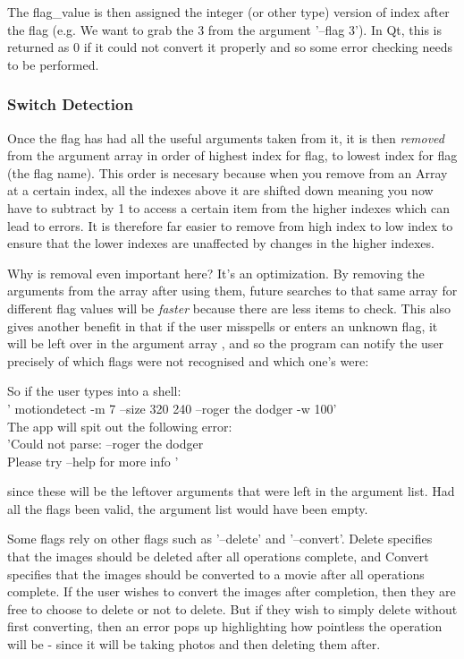 \documentclass[11pt]{article} %
\begin{document}
The flag\_value is then assigned the integer (or other type) version of index after the flag (e.g. We want to grab the 3 from the argument '--flag 3'). In Qt, this is returned as 0 if it could not convert it properly and so some error checking needs to be performed.

\subsubsection{Switch Detection}
Once the flag has had all the useful arguments taken from it, it is then {\it removed} from the argument array in order of highest index for flag, to lowest index for flag (the flag name). This order is necesary because when you remove from an Array at a certain index, all the indexes above it are shifted down meaning you now have to subtract by 1 to access a certain item from the higher indexes which can lead to errors. It is therefore far easier to remove from high index to low index to ensure that the lower indexes are unaffected by changes in the higher indexes.

Why is removal even important here? It's an optimization. By removing the arguments from the array after using them, future searches to that same array for different flag values will be {\it faster} because there are less items to check. This also gives another benefit in that if the user misspells or enters an unknown flag, it will be left over in the argument array , and so the program can notify the user precisely of which flags were not recognised and which one's were:
\begin{frame}[fragile]

\end{frame}

So if the user types into a shell:\\
' motiondetect -m 7 --size 320 240 --roger the dodger -w 100'\\
The app will spit out the following error:\\
'Could not parse: --roger the dodger\\Please try --help for more info '

since these will be the leftover arguments that were left in the argument list. Had all the flags been valid, the argument list would have been empty.

Some flags rely on other flags such as '--delete' and '--convert'.  Delete specifies that the images should be deleted after all operations complete, and Convert specifies that the images should be converted to a movie after all operations complete. 
If the user wishes to convert the images after completion, then they are free to choose to delete or not to delete. But if they wish to simply delete without first converting, then an error pops up highlighting how pointless the operation will be - since it will be taking photos and then deleting them after.
\end{document}
